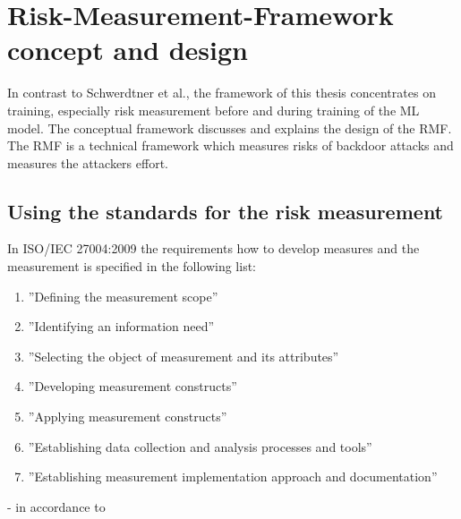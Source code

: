 
\section{Risk-Measurement-Framework concept and design}
\label{sec:conFrame}

In contrast to Schwerdtner et al., the framework of this thesis concentrates on training, especially risk measurement before and during training of the ML model. The conceptual framework discusses and explains the design of the RMF. The RMF is a technical framework which measures risks of backdoor attacks and measures the attackers effort.

\subsection{Using the standards for the risk measurement}
\label{sec:standard}

In ISO/IEC 27004:2009 the requirements how to develop measures and the measurement is specified in the following list:

\begin{enumerate}[label=(\alph*)]
  \item \label{itm:a} ''Defining the measurement scope''
  \item \label{itm:b} ''Identifying an information need''
  \item \label{itm:c} ''Selecting the object of measurement and its attributes''
  \item \label{itm:d} ''Developing measurement constructs''
  \item \label{itm:e} ''Applying measurement constructs''
  \item \label{itm:f} ''Establishing data collection and analysis processes and tools''
  \item \label{itm:g} ''Establishing measurement implementation approach and documentation''
\end{enumerate}

\hfill - in accordance to \cite{ISO_27004_2009} \\

